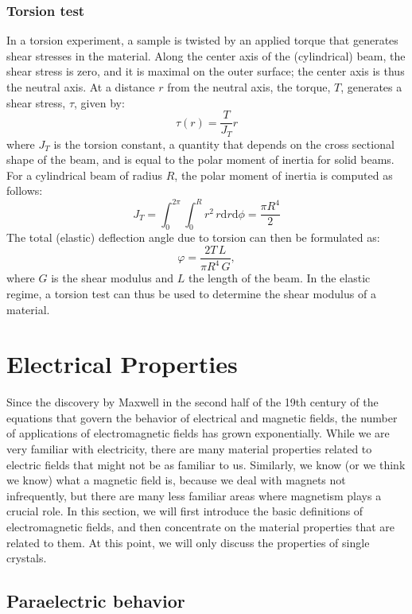\subsubsection{Torsion test}
In a torsion experiment, a sample is twisted by an applied torque that generates shear stresses in the material.  Along the center axis of the (cylindrical) beam, the shear stress is zero, and it is maximal on the outer surface; the center axis is thus the neutral axis.  At a distance $r$ from the neutral axis, the torque, $T$, generates a shear stress, $\tau$, given by:
\[
	\tau(r) = \frac{T}{J_T}r
\]
where $J_T$ is the torsion constant, a quantity that depends on the cross sectional shape of the beam, and is equal to the polar moment of inertia for solid beams.  For a cylindrical beam of radius $R$, the polar moment of inertia is computed as follows:
\[
	J_T = \int_0^{2\pi}\int_0^{R} r^2\,r\mathrm{d}r\mathrm{d}\phi = \frac{\pi R^4}{2}
\]
The total (elastic) deflection angle due to torsion can then be formulated as:
\[
	\varphi = \frac{2T\,L}{\pi R^4\,G},
\]
where $G$ is the shear modulus and $L$ the length of the beam. In the elastic regime, a torsion test can thus be used to determine the shear modulus of a material.


\section{Electrical Properties}\label{\chabbr:sec:emag}

%

Since the discovery by Maxwell in the second half of the 19th century of the equations that govern the behavior of electrical and magnetic fields, the number of applications of electromagnetic fields has grown exponentially.  While we are very familiar with electricity, there are many material properties related to electric fields that might not be as familiar to us.  Similarly, we know (or we think we know) what a magnetic field is, because we deal with magnets not infrequently, but there are many less familiar areas where magnetism plays a crucial role.  In this section, we will first introduce the basic definitions of electromagnetic fields, and then concentrate on the material properties that are related to them.  At this point, we will only discuss the properties of single crystals.

\subsection{Paraelectric behavior}

